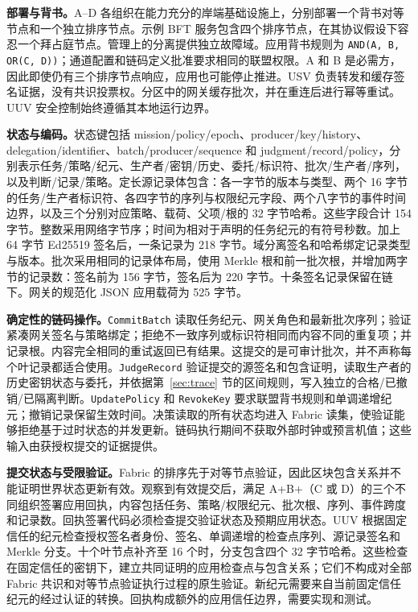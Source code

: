 \textbf{部署与背书。}A--D 各组织在能力充分的岸端基础设施上，分别部署一个背书对等节点和一个独立排序节点。示例 BFT 服务包含四个排序节点，在其协议假设下容忍一个拜占庭节点。管理上的分离提供独立故障域。应用背书规则为 \texttt{AND(A, B, OR(C, D))}；通道配置和链码定义批准要求相同的联盟权限。A 和 B 是必需方，因此即使仍有三个排序节点响应，应用也可能停止推进。USV 负责转发和缓存签名证据，没有共识投票权。分区中的网关缓存批次，并在重连后进行幂等重试。UUV 安全控制始终遵循其本地运行边界。

\textbf{状态与编码。}状态键包括 mission/policy/epoch、producer/key/history、delegation/identifier、batch/producer/sequence 和 judgment/record/policy，分别表示任务/策略/纪元、生产者/密钥/历史、委托/标识符、批次/生产者/序列，以及判断/记录/策略。定长源记录体包含：各一字节的版本与类型、两个 16 字节的任务/生产者标识符、各四字节的序列与权限纪元字段、两个八字节的事件时间边界，以及三个分别对应策略、载荷、父项/根的 32 字节哈希。这些字段合计 154 字节。整数采用网络字节序；时间为相对于声明的任务纪元的有符号秒数。加上 64 字节 Ed25519 签名后，一条记录为 218 字节。域分离签名和哈希绑定记录类型与版本。批次采用相同的记录体布局，使用 Merkle 根和前一批次根，并增加两字节的记录数：签名前为 156 字节，签名后为 220 字节。十条签名记录保留在链下。网关的规范化 JSON 应用载荷为 525 字节。

\textbf{确定性的链码操作。}\texttt{CommitBatch} 读取任务纪元、网关角色和最新批次序列；验证紧凑网关签名与策略绑定；拒绝不一致序列或标识符相同而内容不同的重复项；并记录根。内容完全相同的重试返回已有结果。这提交的是可审计批次，并不声称每个叶记录都适合使用。\texttt{JudgeRecord} 验证提交的源签名和包含证明，读取生产者的历史密钥状态与委托，并依据第~\ref{sec:trace} 节的区间规则，写入独立的合格/已撤销/已隔离判断。\texttt{UpdatePolicy} 和 \texttt{RevokeKey} 要求联盟背书规则和单调递增纪元；撤销记录保留生效时间。决策读取的所有状态均进入 Fabric 读集，使验证能够拒绝基于过时状态的并发更新。链码执行期间不获取外部时钟或预言机值；这些输入由获授权提交的证据提供。

\textbf{提交状态与受限验证。}Fabric 的排序先于对等节点验证，因此区块包含关系并不能证明世界状态更新有效\citep{androulaki2018hyperledger,hyperledger2026fabric}。观察到有效提交后，满足 A+B+（C 或 D）的三个不同组织签署应用回执，内容包括任务、策略/权限纪元、批次根、序列、事件跨度和记录数。回执签署代码必须检查提交验证状态及预期应用状态。UUV 根据固定信任的纪元检查授权签名者身份、签名、单调递增的检查点序列、源记录签名和 Merkle 分支。十个叶节点补齐至 16 个时，分支包含四个 32 字节哈希。这些检查在固定信任的密钥下，建立共同证明的应用检查点与包含关系；它们不构成对全部 Fabric 共识和对等节点验证执行过程的原生验证。新纪元需要来自当前固定信任纪元的经过认证的转换。回执构成额外的应用信任边界，需要实现和测试。


